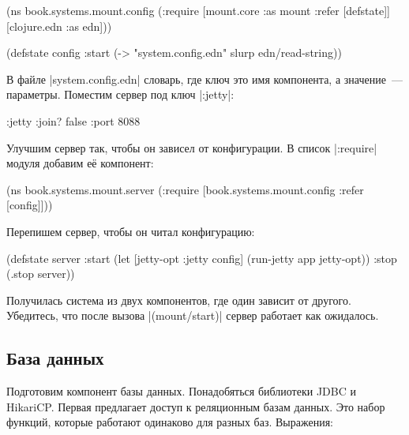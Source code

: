 \begin{english}
  \begin{clojure}
(ns book.systems.mount.config
  (:require
   [mount.core :as mount :refer [defstate]]
   [clojure.edn :as edn]))

(defstate config
  :start
  (-> "system.config.edn"
      slurp
      edn/read-string))
  \end{clojure}
\end{english}

В файле \spverb|system.config.edn| словарь, где ключ это имя компонента, а
значение~--- параметры. Поместим сервер под ключ \spverb|:jetty|:

\begin{english}
  \begin{clojure}
{:jetty {:join? false :port 8088}}
  \end{clojure}
\end{english}

Улучшим сервер так, чтобы он зависел от конфигурации. В список \spverb|:require|
модуля добавим е\"{е} компонент:

\begin{english}
  \begin{clojure}
(ns book.systems.mount.server
 (:require
  [book.systems.mount.config :refer [config]]))
  \end{clojure}
\end{english}

\noindent
Перепишем сервер, чтобы он читал конфигурацию:

\begin{english}
  \begin{clojure}
(defstate server
  :start
  (let [{jetty-opt :jetty} config]
    (run-jetty app jetty-opt))
  :stop (.stop server))
  \end{clojure}
\end{english}

Получилась система из двух компонентов, где один зависит от другого. Убедитесь,
что после вызова \spverb|(mount/start)| сервер работает как ожидалось.

\subsection{База данных}

Подготовим компонент базы данных. Понадобяться библиотеки
JDBC и
HikariCP. Первая предлагает доступ
к реляционным базам данных. Это набор функций, которые работают одинаково для
разных баз. Выражения:

